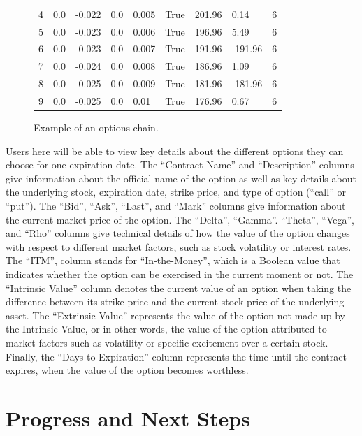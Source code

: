 \documentclass{article}
\begin{document}
\begin{figure}[h]
{\begin{tabular}{lllllllll}
    4 & 0.0   & -0.022 & 0.0  & 0.005 & True & 201.96          & 0.14            & 6                  \\
    5 & 0.0   & -0.023 & 0.0  & 0.006 & True & 196.96          & 5.49            & 6                  \\
    6 & 0.0   & -0.023 & 0.0  & 0.007 & True & 191.96          & -191.96         & 6                  \\
    7 & 0.0   & -0.024 & 0.0  & 0.008 & True & 186.96          & 1.09            & 6                  \\
    8 & 0.0   & -0.025 & 0.0  & 0.009 & True & 181.96          & -181.96         & 6                  \\
    9 & 0.0   & -0.025 & 0.0  & 0.01  & True & 176.96          & 0.67            & 6                 
    \end{tabular}%
    }
    \caption{Example of an options chain.}
    \label{fig:Figure 2}
\end{figure}

Users here will be able to view key details about the different options they can choose for one expiration date. The \enquote{Contract Name} and \enquote{Description} columns give information about the official name of the option as well as key details about the underlying stock, expiration date, strike price, and type of option (\enquote{call} or \enquote{put}). The \enquote{Bid}, \enquote{Ask}, \enquote{Last}, and \enquote{Mark} columns give information about the current market price of the option. The \enquote{Delta}, \enquote{Gamma}. \enquote{Theta}, \enquote{Vega}, and \enquote{Rho} columns give technical details of how the value of the option changes with respect to different market factors, such as stock volatility or interest rates. The \enquote{ITM}, column stands for \enquote{In-the-Money}, which is a Boolean value that indicates whether the option can be exercised in the current moment or not. The \enquote{Intrinsic Value} column denotes the current value of an option when taking the difference between its strike price and the current stock price of the underlying asset. The \enquote{Extrinsic Value} represents the value of the option not made up by the Intrinsic Value, or in other words, the value of the option attributed to market factors such as volatility or specific excitement over a certain stock. Finally, the \enquote{Days to Expiration} column represents the time until the contract expires, when the value of the option becomes worthless.  

\section{Progress and Next Steps}
\end{document}
